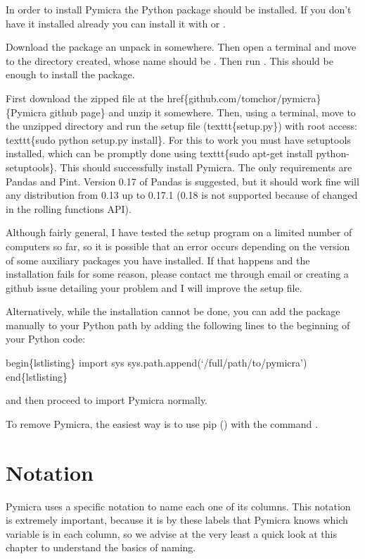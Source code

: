 \documentclass[a4paper,10pt,english]{sphinxmanual}
\begin{document}
In order to install Pymicra the  Python package should be
installed. If you don't have it installed already you can install it with
 or .

Download the package an unpack in somewhere. Then open a terminal and
move to the directory created, whose name should be . Then
run . This should be enough to install
the package.

First download the zipped file at the href\{github.com/tomchor/pymicra\}\{Pymicra
github page\} and unzip it somewhere. Then, using a
terminal, move to the unzipped directory and run the setup file
(texttt\{setup.py\}) with
root access: texttt\{sudo python setup.py install\}. For this to work you must
have setuptools installed, which can be promptly done using texttt\{sudo apt-get
install python-setuptools\}. This should successfully install Pymicra. The only
requirements are Pandas and Pint. Version 0.17 of Pandas is suggested, but it
should work fine will any distribution from 0.13 up to 0.17.1 (0.18 is not
supported because of changed in the rolling functions API).

Although fairly general, I have tested the setup program on a limited number of
computers so far, so it is possible that an error occurs depending on the
version of some auxiliary packages you have installed. If that happens and the
installation fails for some reason, please contact me through email or creating
a github issue detailing your problem and I will improve the setup file.

Alternatively, while the installation cannot be done, you can add the package
manually to your Python path by adding the following lines to the beginning of your
Python code:

begin\{lstlisting\}
import sys
sys.path.append(`/full/path/to/pymicra')
end\{lstlisting\}

and then proceed to import Pymicra normally.

To remove Pymicra, the easiest way is to use pip
() with the command
.


\section{Notation}
\label{notation::doc}\label{notation:notation}
Pymicra uses a specific notation to name each one of its columns. This notation
is extremely important, because it is by these labels that Pymicra knows which
variable is in each column, so we advise at the very least a quick look at this chapter to
understand the basics of naming.
\end{document}
